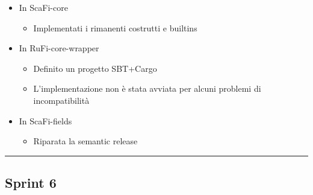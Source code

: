 \documentclass[12pt, a4paper]{article}
\begin{document}
\begin{itemize}
\begin{itemize}
              \item In ScaFi-core
                    \begin{itemize}
                        \item Implementati i rimanenti costrutti e builtins
                    \end{itemize}
              \item In RuFi-core-wrapper
                    \begin{itemize}
                        \item Definito un progetto SBT+Cargo
                        \item L'implementazione non è stata avviata per alcuni problemi di incompatibilità
                    \end{itemize}
              \item In ScaFi-fields
                    \begin{itemize}
                        \item Riparata la semantic release
                    \end{itemize}
          \end{itemize}
\end{itemize}

\par\noindent\rule{\textwidth}{0.5pt}


\subsection*{Sprint 6}
\end{document}
